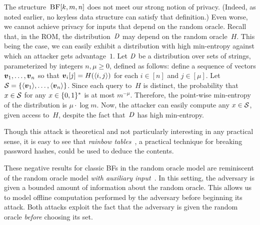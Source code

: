 %
%
The structure~$\textsc{BF}[k,m,n]$ does not meet our strong notion of \ssrep privacy.
(Indeed, as noted earlier, no keyless data structure can satisfy that
definition.)
%
Even worse, we cannot achieve \owrep privacy for inputs that depend on the
random oracle.
%
Recall that, in the ROM, the distribution~$\mathit{D}$ may depend on the random
oracle~$H$.
%
This being the case, we can easily exhibit a distribution with high min-entropy
against which an attacker gets advantage~$1$.
%
Let $\mathit{D}$ be a distribution over sets of strings,
parameterized by integers $n,\mu \geq 0$, defined as follows:
%
define a sequence of vectors $\boldsymbol{v}_1, \ldots, \boldsymbol{v}_n$ so that $\vv_{i}[j] =
H(\str(i,j))$ for each $i\in[n]$ and $j \in [\mu]$.
%
Let $\col = \{\str(\vv_1), \ldots, \str(\vv_n)\}$.
%
Since each query to~$H$ is distinct, the probability that $x \in \mathcal{S}$
for any $x \in \{0,1\}^*$ is at most $m^{-\mu}$. Therefore, the point-wise
min-entropy of the distribution is $\mu \cdot \log m$.
%
Now, the attacker can easily compute any $x \in \mathcal{S}$, given access
to~$H$, despite the fact that~$\mathit{D}$ has high min-entropy.

Though this attack is theoretical and not particularly interesting in any
practical sense, it is easy to see that \emph{rainbow
tables}~\cite{oechslin2003rainbow}, a practical technique for breaking password
hashes, could be used to deduce the contents.

These negative results for classic BFs in the random oracle model are
reminiscent of the random oracle model \emph{with auxiliary
input}~\cite{unruh2007romaux,dodis2017filling}. In this setting, the adversary
is given a bounded amount of information about the random oracle. This allows us
to model offline computation performed by the adversary before beginning its
attack. Both attacks exploit the fact that the adversary is given the random
oracle \emph{before} choosing its set.

